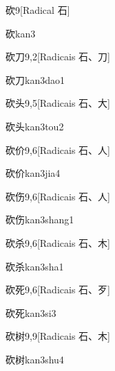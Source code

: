 \begin{entry}{砍}{9}[Radical ⽯]
  \begin{phonetics}{砍}{kan3}
  \end{phonetics}
\end{entry}

\begin{entry}{砍刀}{9,2}[Radicais ⽯、⼑]
  \begin{phonetics}{砍刀}{kan3dao1}
  \end{phonetics}
\end{entry}

\begin{entry}{砍头}{9,5}[Radicais ⽯、⼤]
  \begin{phonetics}{砍头}{kan3tou2}
  \end{phonetics}
\end{entry}

\begin{entry}{砍价}{9,6}[Radicais ⽯、⼈]
  \begin{phonetics}{砍价}{kan3jia4}
  \end{phonetics}
\end{entry}

\begin{entry}{砍伤}{9,6}[Radicais ⽯、⼈]
  \begin{phonetics}{砍伤}{kan3shang1}
  \end{phonetics}
\end{entry}

\begin{entry}{砍杀}{9,6}[Radicais ⽯、⽊]
  \begin{phonetics}{砍杀}{kan3sha1}
  \end{phonetics}
\end{entry}

\begin{entry}{砍死}{9,6}[Radicais ⽯、⽍]
  \begin{phonetics}{砍死}{kan3si3}
  \end{phonetics}
\end{entry}

\begin{entry}{砍树}{9,9}[Radicais ⽯、⽊]
  \begin{phonetics}{砍树}{kan3shu4}
  \end{phonetics}
\end{entry}

